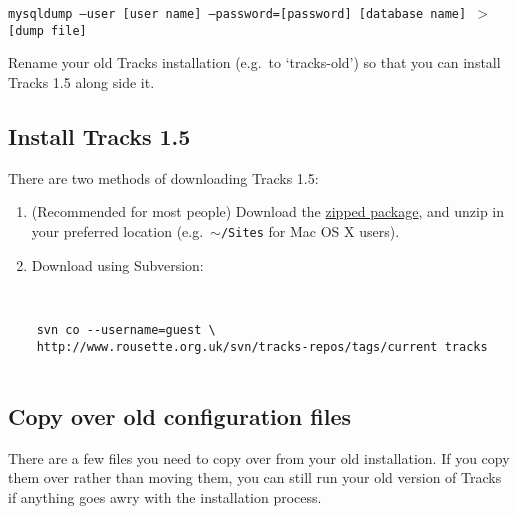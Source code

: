 \documentclass[10pt,twoside]{memoir}
\begin{document}
\texttt{mysqldump ---user [user name] ---password=[password] [database name] $>$ [dump file]}


Rename your old Tracks installation (e.g.\ to `tracks-old') so that you can install Tracks 1.5 along side it.


\subsection{Install Tracks 1.5}
\label{install_upgrade}

There are two methods of downloading Tracks 1.5:


\begin{enumerate}


\item (Recommended for most people) Download the \href{http://www.rousette.org.uk/projects/files/tracks-current.zip}{zipped package}, and unzip in your preferred location (e.g.\ \texttt{\ensuremath{\sim}/Sites} for Mac OS X users).

\item Download using Subversion:
\end{enumerate}

\begin{adjustwidth}{2.5em}{2.5em}
\begin{verbatim}


    svn co --username=guest \ 
    http://www.rousette.org.uk/svn/tracks-repos/tags/current tracks


\end{verbatim}
\end{adjustwidth}

\subsection{Copy over old configuration files}
\label{config_upgrade}

There are a few files you need to copy over from your old installation. If you copy them over rather than moving them, you can still run your old version of Tracks if anything goes awry with the installation process.
\end{document}
